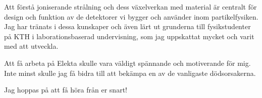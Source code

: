 \documentclass[11pt, a4paper]{../awesome-cv} %
\begin{document}
\begin{cvletter}
Att förstå joniserande strålning och dess växelverkan med material är centralt för design och funktion av de detektorer vi bygger och använder inom partikelfysiken. 
Jag har tränats i dessa kunskaper och även lärt ut grunderna till fysikstudenter på KTH i laborationsbaserad undervisning, som jag uppskattat mycket och varit med att utveckla.

Att få arbeta på Elekta skulle vara väldigt spännande och motiverande för mig.
Inte minst skulle jag få bidra till att bekämpa en av de vanligaste dödsorsakerna.

Jag hoppas på att få höra från er snart!

\end{cvletter}


\makeletterclosing %
\end{document}
